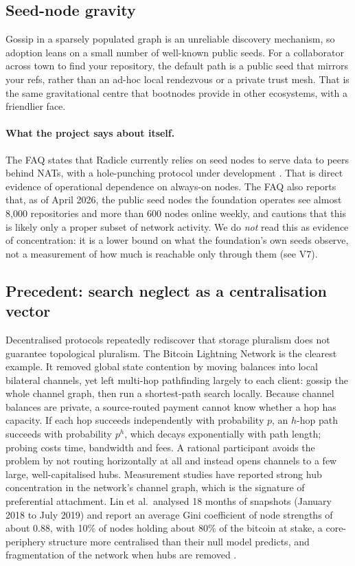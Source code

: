 \documentclass[a4paper,11pt,twoside,parskip=half-,headings=small]{scrartcl}
\begin{document}
\subsection{Seed-node gravity}
Gossip in a sparsely populated graph is an unreliable discovery mechanism, so adoption
leans on a small number of well-known public seeds. For a collaborator across town to
find your repository, the default path is a public seed that mirrors your refs, rather than
an ad-hoc local rendezvous or a private trust mesh. That is the same gravitational centre that
bootnodes provide in other ecosystems, with a friendlier face.

\paragraph{What the project says about itself.} The FAQ states that Radicle currently relies on seed nodes to serve data to peers behind NATs, with a hole-punching protocol under development . That is direct evidence of operational dependence on always-on nodes. The FAQ also reports that, as of April 2026, the public seed nodes the foundation operates see almost 8{,}000 repositories and more than 600 nodes online weekly, and cautions that this is likely only a proper subset of network activity. We do \emph{not} read this as evidence of concentration: it is a lower bound on what the foundation's own seeds observe, not a measurement of how much is reachable only through them (see V7).

\subsection{Precedent: search neglect as a centralisation vector}
\label{sec:lightning}

Decentralised protocols repeatedly rediscover that storage pluralism does not guarantee topological pluralism. The Bitcoin Lightning
Network is the clearest example. It removed global state contention by moving balances into local bilateral channels, yet left multi-hop
pathfinding largely to each client: gossip the whole channel graph, then run a shortest-path search locally. Because channel balances are private,
a source-routed payment cannot know whether a hop has capacity. If each hop succeeds independently with probability $p$, an $h$-hop path succeeds with probability
$p^{h}$, which decays exponentially with path length; probing costs time, bandwidth and fees. A rational participant avoids the problem by not routing
horizontally at all and instead opens channels to a few large, well-capitalised hubs. Measurement studies have reported strong hub concentration
in the network's channel graph, which is the signature of preferential attachment. Lin et al.\ analysed 18 months of snapshots (January 2018 to July 2019) and report an average Gini coefficient of node strengths of about 0.88, with 10\% of nodes holding about 80\% of the bitcoin at stake, a core-periphery structure more centralised than their null model predicts, and fragmentation of the network when hubs are removed .
\end{document}
